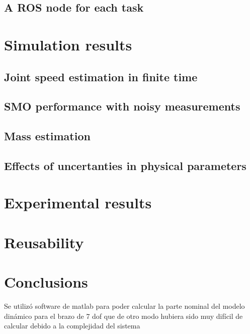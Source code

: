 \documentclass[a4paper, 10pt]{article}
\begin{document}
\subsection{A ROS node for each task}

\section{Simulation results}
\subsection{Joint speed estimation in finite time}

\subsection{SMO performance with noisy measurements}

\subsection{Mass estimation}

\subsection{Effects of uncertanties in physical parameters}

\section{Experimental results}

\section{Reusability}

\section{Conclusions}
Se utilizó software de matlab para poder calcular la parte nominal del modelo dinámico para el brazo de 7 dof que de otro modo hubiera sido muy difícil de calcular debido a la complejidad del sistema



\end{document}
